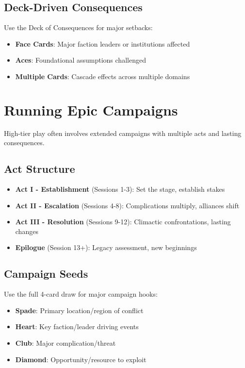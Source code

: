 \subsection*{Deck-Driven Consequences}

Use the Deck of Consequences for major setbacks:
\begin{itemize}
    \item \textbf{Face Cards}: Major faction leaders or institutions affected
    \item \textbf{Aces}: Foundational assumptions challenged
    \item \textbf{Multiple Cards}: Cascade effects across multiple domains
\end{itemize}

\section{Running Epic Campaigns}

High-tier play often involves extended campaigns with multiple acts and lasting consequences.

\subsection*{Act Structure}

\begin{itemize}
    \item \textbf{Act I - Establishment} (Sessions 1-3): Set the stage, establish stakes
    \item \textbf{Act II - Escalation} (Sessions 4-8): Complications multiply, alliances shift
    \item \textbf{Act III - Resolution} (Sessions 9-12): Climactic confrontations, lasting changes
    \item \textbf{Epilogue} (Session 13+): Legacy assessment, new beginnings
\end{itemize}

\subsection*{Campaign Seeds}

Use the full 4-card draw for major campaign hooks:
\begin{itemize}
    \item \textbf{Spade}: Primary location/region of conflict
    \item \textbf{Heart}: Key faction/leader driving events
    \item \textbf{Club}: Major complication/threat
    \item \textbf{Diamond}: Opportunity/resource to exploit
\end{itemize}

